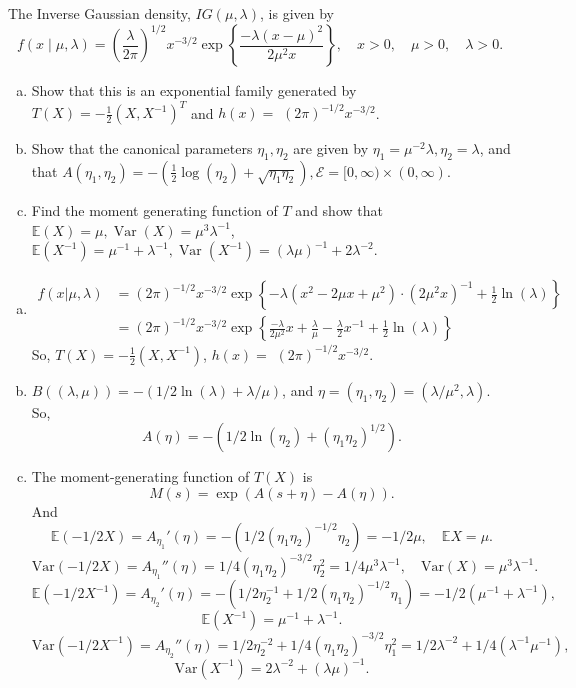 \begin{ex}
	The Inverse Gaussian density, \(I G(\mu, \lambda)\), is given by
	\[
		f(x \mid \mu, \lambda)=\left(\frac{\lambda}{2 \pi}\right)^{1 / 2} x^{-3 / 2} \exp \left\{\frac{-\lambda(x-\mu)^{2}}{2 \mu^{2} x}\right\}, \quad x>0, \quad \mu>0, \quad \lambda>0.
	\]
	\begin{enumerate}[(a)]
		\item Show that this is an exponential family generated by \(T(X)=-\frac{1}{2}\left(X, X^{-1}\right)^{T}\) and \(h(x)=\) \((2 \pi)^{-1 / 2} x^{-3 / 2}\).
		\item Show that the canonical parameters \(\eta_{1}, \eta_{2}\) are given by \(\eta_{1}=\mu^{-2} \lambda, \eta_{2}=\lambda\), and that \(A\left(\eta_{1}, \eta_{2}\right)=-\left(\frac{1}{2} \log \left(\eta_{2}\right)+\sqrt{\eta_{1} \eta_{2}}\right), \mathcal{E}=[0, \infty) \times(0, \infty)\).
		\item Find the moment generating function of \(T\) and show that \(\mathbb{E}(X)=\mu, \operatorname{Var}(X)=\mu^{3} \lambda^{-1}\), \(\mathbb{E}\left(X^{-1}\right)=\mu^{-1}+\lambda^{-1}, \operatorname{Var}\left(X^{-1}\right)=(\lambda \mu)^{-1}+2 \lambda^{-2} .\)
	\end{enumerate}
\end{ex}

\begin{solution}
	\begin{enumerate}[(a)]
		\item \[
			\begin{aligned}
				f(x|\mu,\lambda)&=(2 \pi)^{-1 / 2} x^{-3 / 2}\exp\left\{-\lambda(x^2-2\mu x+\mu^2)\cdot(2\mu^2x)^{-1}+\frac{1}{2}\ln(\lambda)\right\}\\
				&=(2 \pi)^{-1 / 2} x^{-3 / 2}\exp\left\{\frac{-\lambda}{2\mu^2}x + \frac{\lambda}{\mu}-\frac{\lambda}{2}x^{-1}+\frac{1}{2}\ln(\lambda)\right\}
			\end{aligned}
		\]
		So, $T(X)=-\frac{1}{2}(X,X^{-1})$, \(h(x)=\) \((2 \pi)^{-1 / 2} x^{-3 / 2}\).
		\item $B((\lambda, \mu))=-(1/2\ln(\lambda)+\lambda/\mu)$, and $\eta=(\eta_1,\eta_2)=(\lambda/\mu^2, \lambda)$. So,
		\[
			A(\eta)=-(1/2\ln(\eta_2)+(\eta_1\eta_2)^{1/2}).
		\]
		\item The moment-generating function of $T(X)$ is
		\[
			M(s)=\exp\left(A(s+\eta)-A(\eta)\right).
		\]
		And
		\[
			\mathbb{E}(-1/2X)=A_{\eta_1}'(\eta)=-(1/2(\eta_1\eta_2)^{-1/2}\eta_2)=-1/2\mu,\quad \mathbb{E}X=\mu.
		\]
		\[
			\text{Var}(-1/2X)=A_{\eta_1}''(\eta)=1/4(\eta_1\eta_2)^{-3/2}\eta_2^2=1/4\mu^3\lambda^{-1},\quad \text{Var}(X)=\mu^3\lambda^{-1}.
		\]
		\[
			\mathbb{E}(-1/2X^{-1})=A_{\eta_2}'(\eta)=-(1/2\eta_2^{-1}+1/2(\eta_1\eta_2)^{-1/2}\eta_1)=-1/2(\mu^{-1}+\lambda^{-1}),
		\]
		\[
			\mathbb{E}(X^{-1})=\mu^{-1}+\lambda^{-1}.
		\]
		\[
			\text{Var}(-1/2X^{-1})=A_{\eta_2}''(\eta)=1/2\eta_2^{-2}+1/4(\eta_1\eta_2)^{-3/2}\eta_1^2=1/2\lambda^{-2}+1/4(\lambda^{-1}\mu^{-1}),
		\]
		\[
			\text{Var}(X^{-1})=2\lambda^{-2}+(\lambda\mu)^{-1}.
		\]
	\end{enumerate}
\end{solution}

